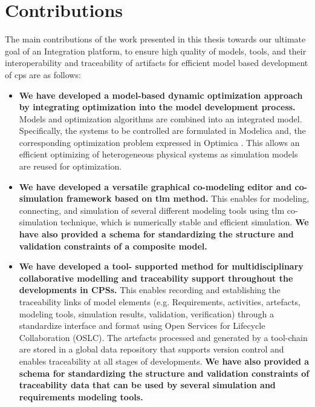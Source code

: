 \section{Contributions}
\label{sec:Contributions}


The main contributions of the work presented in this thesis towards our ultimate goal of an Integration platform, to ensure high quality of models, tools, and their interoperability and traceability of artifacts for efficient model based development of \acrshort{cps} are as follows:

\begin{itemize}
	
\item \textbf{We have developed a model-based dynamic optimization approach 
by integrating optimization into the model development process.}
Models and optimization algorithms are combined into an integrated 
model. Specifically, the systems to be controlled are formulated 
in Modelica and, the corresponding optimization problem expressed 
in Optimica \cite{optimica}. This allows an efficient optimizing of 
heterogeneous physical systems as simulation models are reused for optimization.

\item \textbf{We have developed a versatile graphical co-modeling editor and co-simulation framework based on \acrshort{tlm} method.} This enables for modeling, connecting, and simulation of several different modeling tools using \acrshort{tlm} co-simulation technique, which is numerically stable and efficient simulation. \textbf{We have also provided a schema for standardizing the structure and validation constraints of a composite model.} 

\item \textbf{We have developed a tool- supported method for multidisciplinary collaborative modelling and traceability support throughout the developments in CPSs.} This enables recording and establishing the traceability links of model elements (e.g. Requirements, activities, artefacts, modeling tools, simulation results, validation, verification) through a standardize interface and format using Open Services for Lifecycle Collaboration (OSLC). The artefacts processed and generated by a tool-chain are stored in a global data repository that supports version control and enables traceability at all stages of developments.\textbf{ We have also provided a schema for standardizing the structure and validation constraints of traceability data that can be used by several simulation and requirements modeling tools.} 


\end{itemize}

